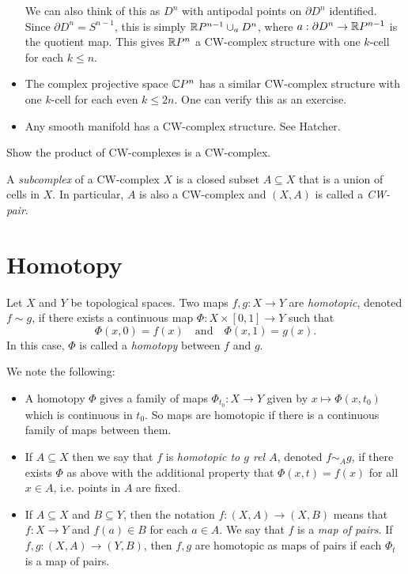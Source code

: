 \begin{example}
\begin{itemize}
      We can also think of this as $D^n$ with
      antipodal points on $\partial D^n$ identified.
      Since $\partial D^n = S^{n - 1}$, this is
      simply $\mathbb{R} P^{n - 1} \cup_{a} D^n$, where
      $a : \partial D^n \to \mathbb{R} P^{n - 1}$ is the
      quotient map. This gives $\mathbb{R} P^n$ a CW-complex
      structure with one $k$-cell for each $k \le n$.
    \item The complex projective space
      $\mathbb{C} P^n$ has a similar CW-complex structure with
      one $k$-cell for each even $k \le 2n$.
      One can verify this as an exercise.
    \item Any smooth manifold has a CW-complex
      structure. See Hatcher.
  \end{itemize}
\end{example}

\begin{exercise}
  Show the product of CW-complexes is a CW-complex.
\end{exercise}

\begin{definition}
  A \emph{subcomplex} of a CW-complex $X$ is a closed
  subset $A \subseteq X$ that is a union of cells in $X$.
  In particular, $A$ is also a CW-complex and
  $(X, A)$ is called a \emph{CW-pair}.
\end{definition}

\section{Homotopy}

\begin{definition}
  Let $X$ and $Y$ be topological spaces. Two maps
  $f, g : X \to Y$ are \emph{homotopic}, denoted
  $f \sim g$, if there exists a continuous map
  $\Phi : X \times [0, 1] \to Y$ such that
  \[
    \Phi(x, 0) = f(x) \quad \text{and} \quad \Phi(x, 1) = g(x).
  \]
  In this case, $\Phi$ is called a \emph{homotopy}
  between $f$ and $g$.
\end{definition}

\begin{remark}
  We note the following:
  \begin{itemize}
    \item A homotopy $\Phi$ gives a family of maps
      $\Phi_{t_0} : X \to Y$ given by
      $x \mapsto \Phi(x, t_0)$ which is continuous
      in $t_0$. So maps are homotopic if there is a
      continuous family of maps between them.
    \item If $A \subseteq X$ then we say that
      $f$ is \emph{homotopic to $g$ rel $A$},
      denoted $f \sim_A g$, if there exists
      $\Phi$ as above with the additional property
      that $\Phi(x, t) = f(x)$ for all $x \in A$,
      i.e. points in $A$ are fixed.
    \item If $A \subseteq X$ and $B \subseteq Y$,
      then the notation $f : (X, A) \to (X, B)$
      means that $f : X \to Y$ and
      $f(a) \in B$ for each $a \in A$.
      We say that $f$ is a \emph{map of pairs}.
      If $f, g : (X, A) \to (Y, B)$, then $f, g$
      are homotopic as maps of pairs if each
      $\Phi_t$ is a map of pairs.
  \end{itemize}
\end{remark}
